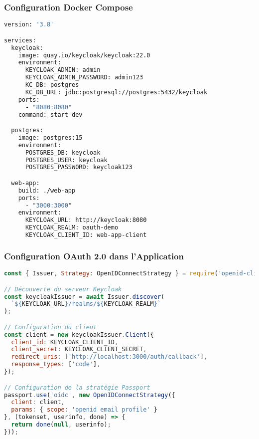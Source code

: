 \documentclass[aspectratio=169]{beamer}
\begin{document}
\begin{frame}[fragile]
    \frametitle{\faDocker \quad Configuration Docker Compose}
    \begin{lstlisting}[language=bash, caption=Configuration des services]
version: '3.8'

services:
  keycloak:
    image: quay.io/keycloak/keycloak:22.0
    environment:
      KEYCLOAK_ADMIN: admin
      KEYCLOAK_ADMIN_PASSWORD: admin123
      KC_DB: postgres
      KC_DB_URL: jdbc:postgresql://postgres:5432/keycloak
    ports:
      - "8080:8080"
    command: start-dev

  postgres:
    image: postgres:15
    environment:
      POSTGRES_DB: keycloak
      POSTGRES_USER: keycloak
      POSTGRES_PASSWORD: keycloak123

  web-app:
    build: ./web-app
    ports:
      - "3000:3000"
    environment:
      KEYCLOAK_URL: http://keycloak:8080
      KEYCLOAK_REALM: oauth-demo
      KEYCLOAK_CLIENT_ID: web-app-client
    \end{lstlisting}
\end{frame}

\begin{frame}[fragile]
    \frametitle{Configuration OAuth 2.0 dans l'Application}
    \begin{lstlisting}[language=JavaScript, caption=Configuration Passport.js]
const { Issuer, Strategy: OpenIDConnectStrategy } = require('openid-client');

// Découverte du serveur Keycloak
const keycloakIssuer = await Issuer.discover(
  `${KEYCLOAK_URL}/realms/${KEYCLOAK_REALM}`
);

// Configuration du client
const client = new keycloakIssuer.Client({
  client_id: KEYCLOAK_CLIENT_ID,
  client_secret: KEYCLOAK_CLIENT_SECRET,
  redirect_uris: ['http://localhost:3000/auth/callback'],
  response_types: ['code'],
});

// Configuration de la stratégie Passport
passport.use('oidc', new OpenIDConnectStrategy({
  client: client,
  params: { scope: 'openid email profile' }
}, (tokenset, userinfo, done) => {
  return done(null, userinfo);
}));
    \end{lstlisting}
\end{frame}
\end{document}
